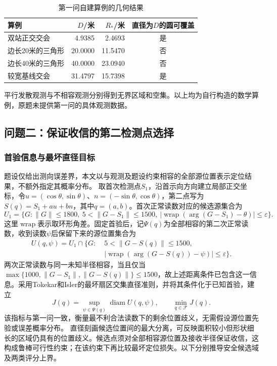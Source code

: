 \documentclass{JXUSTmodeling}
\begin{document}
\begin{table}[htbp]
 \centering
 \caption{第一问自建算例的几何结果}
 \label{tab:p1_geometry}
 \begin{tabular}{lrrc}
 \hline
 算例 & $D$/米 & $R_*$/米 & 直径为$D$的圆可覆盖\\
 \hline
 双站正交交会 & 4.9385 & 2.4693 & 是\\
 边长20米的三角形 & 20.0000 & 11.5470 & 否\\
 边长40米的三角形 & 40.0000 & 23.0940 & 否\\
 较宽基线交会 & 31.4797 & 15.7398 & 是\\
 \hline
 \end{tabular}
\end{table}
平行发散观测与不相容观测分别得到无界区域和空集。以上均为自行构造的数学算例，原题未提供第一问的具体观测数据。
\FloatBarrier

\subsection{问题二：保证收信的第二检测点选择}
\label{sub:model_p2}
\subsubsection{首验信息与最坏直径目标}
题设仅给出测向误差界，本文以与观测及题设约束相容的全部源位置表示定位结果，不额外指定其概率分布。
取首次检测点$S_1$，沿首示向方向建立局部正交坐标，令$u=(\cos\theta,\sin\theta)$、$n=(-\sin\theta,\cos\theta)$，第二点写为$S(q)=S_1+a u+b n$，其中$q=(a,b)$。首次正常读数对应的候选源集合为
\begin{equation}
 U_1=\{G:\|G\|\le1800,\ 5<\|G-S_1\|\le1500,
 \ |\operatorname{wrap}(\arg(G-S_1)-\theta)|\le\varepsilon\}.
\end{equation}
这里$\operatorname{wrap}$表示取环形角差。固定首验后，记$\Psi(q)$为全部相容的第二次正常读数，收到读数$\psi$后保留下来的源位置集合为
\begin{equation}
 \begin{aligned}
 U(q,\psi)=U_1\cap\{G:\;&5<\|G-S(q)\|\le1500,\\
 &|\operatorname{wrap}(\arg(G-S(q))-\psi)|\le\varepsilon\}.
 \end{aligned}
\end{equation}
两次正常读数与同一未知半径相容，当且仅当$\max\{1000,\|G-S_1\|,\|G-S(q)\|\}\le1500$，故上述距离条件已包含这一信息。采用Tokekar和Isler的最坏扇区交集直径准则\cite{tokekar}，并将其条件化于已知首验，建立
\begin{equation}
 J(q)=\sup_{\psi\in\Psi(q)}\operatorname{diam}U(q,\psi),\qquad
 \min_{q\in\mathcal F}J(q).
 \label{eq:p2_objective}
\end{equation}
该指标与第一问一致，衡量最不利合法读数下的剩余位置歧义，无需假设源位置先验或误差概率分布。
直径刻画候选位置间的最大分离，可反映面积较小但形状细长的区域仍具有的位置歧义。候选点须对全部相容源位置及接收半径保证收信，这构成鲁棒可行性约束\cite{bertsimas2011}；在该约束下再比较最坏定位损失。以下分别推导安全候选域及两类评分上界。
\end{document}
